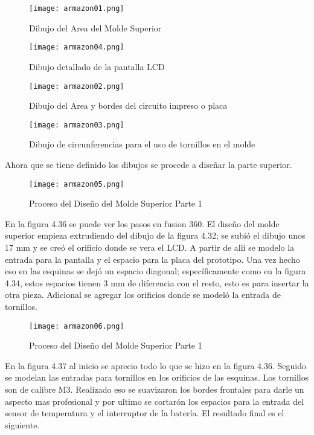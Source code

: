 \begin{figure}[H]
	\centering
	\texttt{[image: armazon01.png]}
	\caption{Dibujo del Area del Molde Superior}
\end{figure}

\begin{figure}[H]
	\centering
	\texttt{[image: armazon04.png]}
	\caption{Dibujo detallado de la pantalla LCD}
\end{figure}

\begin{figure}[H]
	\centering
	\texttt{[image: armazon02.png]}
	\caption{Dibujo del Area y bordes del circuito impreso o placa}
\end{figure}

\begin{figure}[H]
	\centering
	\texttt{[image: armazon03.png]}
	\caption{Dibujo de circunferencias para el uso de tornillos en el molde}
\end{figure}

\clearpage

\par \noindent
Ahora que se tiene definido los dibujos se procede a diseñar la parte superior.

\begin{figure}[H]
	\centering
	\texttt{[image: armazon05.png]}
	\caption{Proceso del Diseño del Molde Superior Parte 1}
\end{figure}

\par \noindent
En la figura 4.36 se puede ver los pasos en fusion 360. El diseño del molde superior empieza extrudiendo del dibujo de la figura 4.32; se subió el dibujo unos 17 mm y se creó el orificio donde se vera el LCD. A partir de allí se modelo la entrada para la pantalla y el espacio para la placa del prototipo. Una vez hecho eso en las esquinas se dejó un espacio diagonal; específicamente como en la figura 4.34, estos espacios tienen 3 mm de diferencia con el resto, esto es para insertar la otra pieza. Adicional se agregar los orificios donde se modeló la entrada de tornillos.

\begin{figure}[H]
	\centering
	\texttt{[image: armazon06.png]}
	\caption{Proceso del Diseño del Molde Superior Parte 1}
\end{figure}

\par \noindent
En la figura 4.37 al inicio se aprecio todo lo que se hizo en la figura 4.36. Seguido se modelan las entradas para tornillos en los orificios de las esquinas. Los tornillos son de calibre M3. Realizado eso se suavizaron los bordes frontales para darle un aspecto mas profesional y por ultimo se cortarón los espacios para la entrada del sensor de temperatura y el interruptor de la batería. El resultado final es el siguiente.

